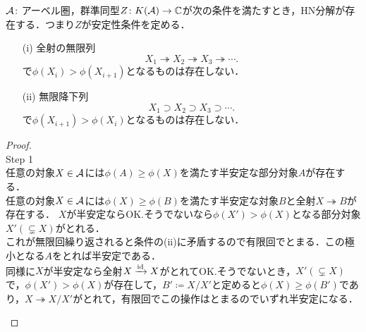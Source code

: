 \begin{prop}\cite{Bri07}
		${\mathcal A}\colon$アーベル圏，群準同型$Z\colon K({\mathcal A})\to {\mathbb C}$が次の条件を満たすとき，HN分解が存在する．つまり$Z$が安定性条件を定める．
		\begin{itemize}
			\item[(i)]
			全射の無限列
			\[X_1\twoheadrightarrow X_2\twoheadrightarrow X_3\twoheadrightarrow\cdots .  \]
		で$\phi (X_i)> \phi (X_{i+1})$となるものは存在しない．
	\item[(ii)]
			無限降下列
		\[X_1\supset X_2\supset X_3\supset \cdots  .\]
		で$\phi (X_{i+1}) > \phi(X_i)$となるものは存在しない．
	\end{itemize}
\end{prop}

\begin{proof}\hfill\\
	Step 1\hspace{5mm}\\
	\bullet 任意の対象$X\in{\mathcal A}$には$\phi(A) \ge \phi(X)$を満たす半安定な部分対象$A$が存在する．\\
	\bullet 任意の対象$X\in{\mathcal A}$には$\phi(X) \ge \phi(B)$を満たす半安定な対象$B$と全射$X\twoheadrightarrow B$が存在する．
	$X$が半安定ならOK.そうでないなら$\phi(X')>\phi(X)$となる部分対象$X'(\subsetneq X)$がとれる．\\
	これが無限回繰り返されると条件の(ii)に矛盾するので有限回でとまる．この極小となる$A$をとれば半安定である．\\
	同様に$X$が半安定なら全射$X\xrightarrow{\mathrm{id}}X$がとれてOK.そうでないとき，$X'(\subsetneq X)$で，$\phi(X')>\phi(X)$が存在して，$B'\coloneq X/X'$と定めると$\phi(X)\ge\phi(B')$であり，$X\twoheadrightarrow X/X'$がとれて，有限回でこの操作はとまるのでいずれ半安定になる．
\begin{center}
	\usetikzlibrary{arrows.meta}

\end{center}
\end{proof}
